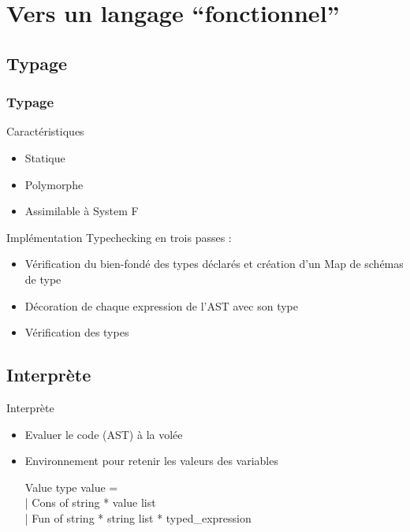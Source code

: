 \section{Vers un langage ``fonctionnel''}

\subsection{Typage}

\begin{frame}
  \frametitle{Typage}
  \begin{block}{Caractéristiques}
    \begin{itemize}
    \item Statique
    \item Polymorphe
    \item Assimilable à System F
    \end{itemize}
  \end{block}
  \begin{block}{Implémentation}
    Typechecking en trois passes :
    \begin{itemize}
      \item Vérification du bien-fondé des types déclarés et création d'un Map de schémas de type
      \item Décoration de chaque expression de l'AST avec son type
      \item Vérification des types
    \end{itemize}
  \end{block}
\end{frame}

\subsection{Interprète}

\begin{frame}{Interprète}
  \begin{itemize}
  \item Evaluer le code (AST) à la volée
  \item Environnement pour retenir les valeurs des variables
    \begin{block}{Value}
      type value =\\
      | Cons of string * value list\\
      | Fun of string * string list * typed\_expression\\
    \end{block}
  \end{itemize}
\end{frame}

